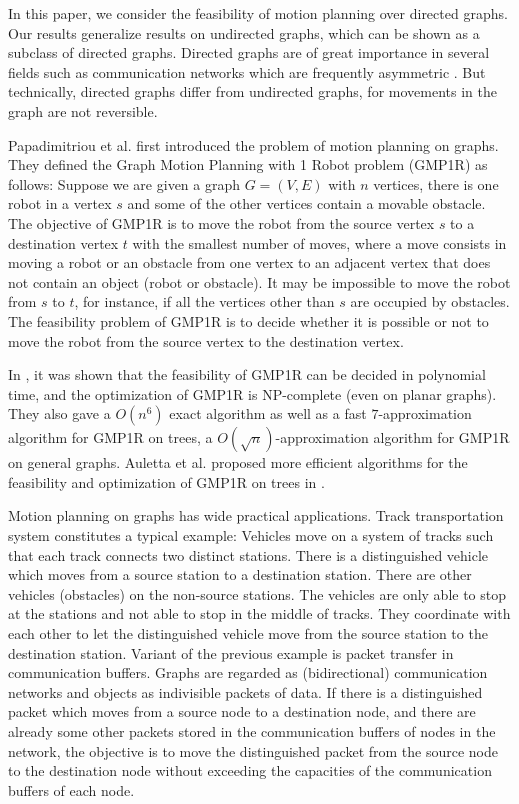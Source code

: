 \documentclass{article}
\begin{document}
In this paper, we consider the feasibility of motion planning over
directed graphs. Our results generalize results on undirected
graphs, which can be shown as a subclass of directed graphs.
Directed graphs are of great importance in several fields such as
communication networks which are frequently asymmetric
\cite{JetchevaJ06}. But technically, directed graphs differ from
undirected graphs, for movements in the graph are not reversible.

Papadimitriou et al. \cite{PapadimitriouRST94} first introduced the
problem of motion planning on graphs. They defined the Graph Motion
Planning with 1 Robot problem (GMP1R) as follows: Suppose we are
given a graph $G=(V,E)$ with $n$ vertices, there is one robot in a
vertex $s$ and some of the other vertices contain a movable
obstacle. The objective of GMP1R is to move the robot from the
source vertex $s$ to a destination vertex $t$ with the smallest
number of moves, where a move consists in moving a robot or an
obstacle from one vertex to an adjacent vertex that does not contain
an object (robot or obstacle). It may be impossible to move the
robot from $s$ to $t$, for instance, if all the vertices other than
$s$ are occupied by obstacles. The feasibility problem of GMP1R is
to decide whether it is possible or not to move the robot from the
source vertex to the destination vertex.

In \cite{PapadimitriouRST94}, it was shown that the feasibility of
GMP1R can be decided in polynomial time, and the optimization of
GMP1R is NP-complete (even on planar graphs). They also gave a
$O(n^6)$ exact algorithm as well as a fast $7$-approximation
algorithm for GMP1R on trees, a $O(\sqrt{n})$-approximation
algorithm for GMP1R on general graphs. Auletta et al. proposed more
efficient algorithms for the feasibility and optimization of GMP1R
on trees in \cite{AulettaMPP96,AulettaP01}.


Motion planning on graphs has wide practical applications. Track
transportation system \cite{Per88} constitutes a typical example:
Vehicles move on a system of tracks such that each track connects
two distinct stations. There is a distinguished vehicle which moves
from a source station to a destination station. There are other
vehicles (obstacles) on the non-source stations. The vehicles are
only able to stop at the stations and not able to stop in the middle
of tracks. They coordinate with each other to let the distinguished
vehicle move from the source station to the destination station.
Variant of the previous example is packet transfer in communication
buffers. Graphs are regarded as (bidirectional) communication
networks and objects as indivisible packets of data. If there is a
distinguished packet which moves from a source node to a destination
node, and there are already some other packets stored in the
communication buffers of nodes in the network, the objective is to
move the distinguished packet from the source node to the
destination node without exceeding the capacities of the
communication buffers of each node.
\end{document}
